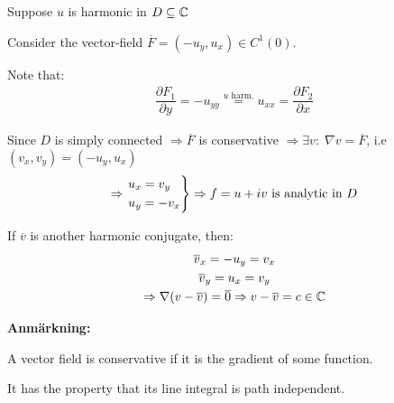 \par\bigskip
\begin{prf}[]{}
  Suppose $u$ is harmonic in $D\subseteq\mathbb{C}$
  \par\bigskip
  \noindent Consider the vector-field $\overline{F} = (-u_y,u_x)\in C^1(0)$.\par
  \noindent Note that:
  \begin{equation*}
    \begin{gathered}
      \dfrac{\partial F_1}{\partial y} = -u_{yy} \stackrel{u\text{ harm.}}{=} u_{xx} = \dfrac{\partial F_2}{\partial x}
    \end{gathered}
  \end{equation*}
  \par\bigskip
  \noindent Since $D$ is simply connected $\Rightarrow\overline{F}$ is conservative $\Rightarrow\exists v:\; \nabla v = \overline{F}$, i.e $(v_x,v_y) = (-u_y,u_x)$
  \begin{equation*}
    \begin{gathered}
      \Rightarrow\begin{rcases}u_x = v_y\\u_y=-v_x\end{rcases}\Rightarrow f = u+iv\text{ is analytic in $D$}
    \end{gathered}
  \end{equation*}
  \par\bigskip
  \noindent If $\overline{v}$ is another harmonic conjugate, then:
  \begin{equation*}
    \begin{gathered}
      \overline{v}_x = -u_y = v_x\\
      \overline{v}_y = u_x = v_y\\
      \Rightarrow\nabla(v-\overline{v}) = \overline{0}\Rightarrow v-\overline{v} = c\in\mathbb{C}
    \end{gathered}
  \end{equation*}
\end{prf}
\par\bigskip
\noindent\textbf{Anmärkning:}\par
\noindent A vector field is conservative if it is the gradient of some function.\par
\noindent It has the property that its line integral is path independent.
